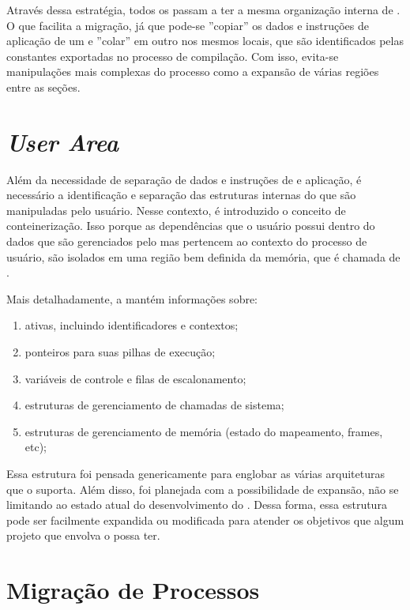     Através dessa estratégia, todos os \clusters passam a ter a mesma organização interna de . O que facilita a migração, já que pode-se ''copiar'' os dados e instruções de aplicação de um \cluster e ''colar'' em outro nos mesmos locais, que são identificados pelas constantes exportadas no processo de compilação. Com isso, evita-se manipulações mais complexas do processo como a expansão de várias regiões entre as seções.


\section{\textit{User Area}}
\label{sec.uarea}

    Além da necessidade de separação de dados e instruções de  e aplicação, é necessário a identificação e separação das estruturas internas do \so que são manipuladas pelo usuário. Nesse contexto, é introduzido o conceito de conteinerização. Isso porque as dependências que o usuário possui dentro do \cluster \ie dados que são gerenciados pelo  mas pertencem ao contexto do processo de usuário, são isolados em uma região bem definida da memória, que é chamada de \uarea. 

    Mais detalhadamente, a \uarea mantém informações sobre:
    \begin{enumerate}[label=(\roman*)]
        \item \threads ativas, incluindo identificadores e contextos;
        \item ponteiros para suas pilhas de execução; 
        \item variáveis de controle e filas de escalonamento;
        \item estruturas de gerenciamento de chamadas de sistema;
        \item estruturas de gerenciamento de memória (estado do mapeamento, frames, etc);
    \end{enumerate}

    Essa estrutura foi pensada genericamente para englobar as várias arquiteturas que o \nanvix suporta. Além disso, foi planejada com a possibilidade de expansão, não se limitando ao estado atual do desenvolvimento do \nanvix. Dessa forma, essa estrutura pode ser facilmente expandida ou modificada para atender os objetivos que algum projeto que envolva o \nanvix possa ter.

\section{Migração de Processos}
\label{sec.migracao}

